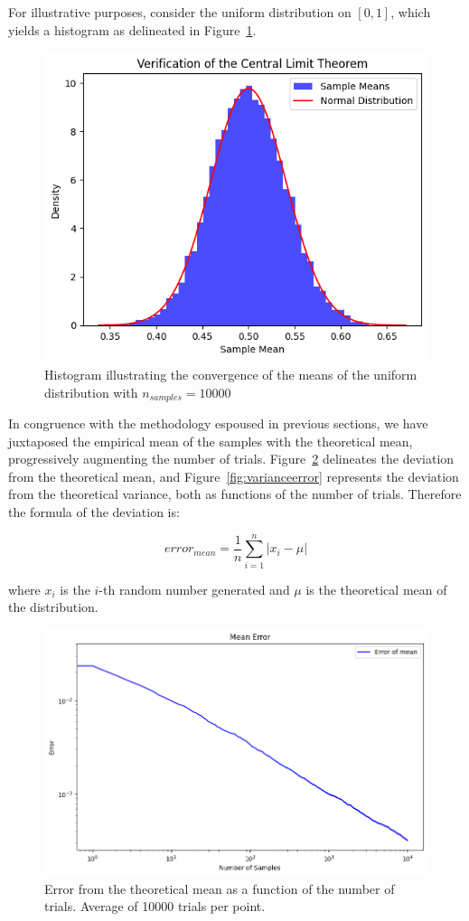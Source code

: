 \documentclass{article}
\begin{document}
For illustrative purposes, consider the uniform distribution on \([0,1]\), which yields a histogram as delineated in Figure~\ref{fig:verificationclt}.

\begin{figure}[H]
	\centering
	\includegraphics[width=0.5\linewidth]{./Figures/CLT/verif.png}
	\caption{Histogram illustrating the convergence of the means of the uniform distribution with $n_{samples} = 10000$}
	\label{fig:verificationclt}
\end{figure}

In congruence with the methodology espoused in previous sections, we have juxtaposed the empirical mean of the samples with the theoretical mean, progressively augmenting the number of trials. Figure~\ref{fig:meanerror} delineates the deviation from the theoretical mean, and Figure~\ref{fig:varianceerror} represents the deviation from the theoretical variance, both as functions of the number of trials. Therefore the formula of the deviation is:

\begin{equation*} error_{mean} = \frac{1}{n}\sum_{i=1}^{n} | x_i - \mu | \end{equation*}

where \(x_i\) is the \(i\)-th random number generated and \(\mu\) is the theoretical mean of the distribution.

\begin{figure}[H]
	\centering
	\includegraphics[width=0.5\linewidth]{./Figures/CLT/meanerror.png}
	\caption{Error from the theoretical mean as a function of the number of trials. Average of 10000 trials per point.}
	\label{fig:meanerror}
\end{figure}
\end{document}
